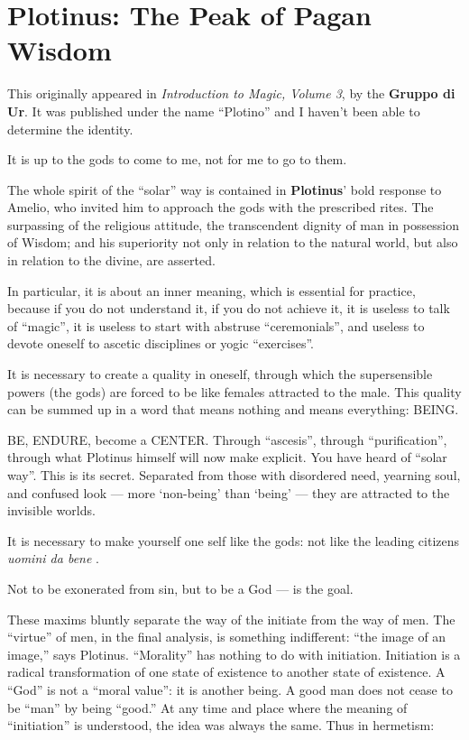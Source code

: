 \section{Plotinus: The Peak of Pagan Wisdom}

\begin{quotex}
This originally appeared in \emph{Introduction to Magic, Volume 3}, by the \textbf{Gruppo di Ur}. It was published under the name ``Plotino'' and I haven't been able to determine the identity.
\end{quotex}

\begin{quotex}
It is up to the gods to come to me, not for me to go to them.
\end{quotex}


The whole spirit of the ``solar'' way is contained in \textbf{Plotinus}' bold response to Amelio, who invited him to approach the gods with the prescribed rites. The surpassing of the religious attitude, the transcendent dignity of man in possession of Wisdom; and his superiority not only in relation to the natural world, but also in relation to the divine, are asserted.

In particular, it is about an inner meaning, which is essential for practice, because if you do not understand it, if you do not achieve it, it is useless to talk of ``magic'', it is useless to start with abstruse ``ceremonials'', and useless to devote oneself to ascetic disciplines or yogic ``exercises''.

It is necessary to create a quality in oneself, through which the supersensible powers (the gods) are forced to be like females attracted to the male. This quality can be summed up in a word that means nothing and means everything: BEING.

BE, ENDURE, become a CENTER. Through ``ascesis'', through ``purification'', through what Plotinus himself will now make explicit. You have heard of ``solar way''. This is its secret. Separated from those with disordered need, yearning soul, and confused look --- more `non-being' than `being' --- they are attracted to the invisible worlds.

\begin{quotex}
It is necessary to make yourself one self like the gods: not like the leading citizens \emph{uomini da bene} .

Not to be exonerated from sin, but to be a God --- is the goal.
\end{quotex}


These maxims bluntly separate the way of the initiate from the way of men. The ``virtue'' of men, in the final analysis, is something indifferent: ``the image of an image,'' says Plotinus. ``Morality'' has nothing to do with initiation. Initiation is a radical transformation of one state of existence to another state of existence. A ``God'' is not a ``moral value'': it is another being. A good man does not cease to be ``man'' by being ``good.'' At any time and place where the meaning of ``initiation'' is understood, the idea was always the same. Thus in hermetism:

